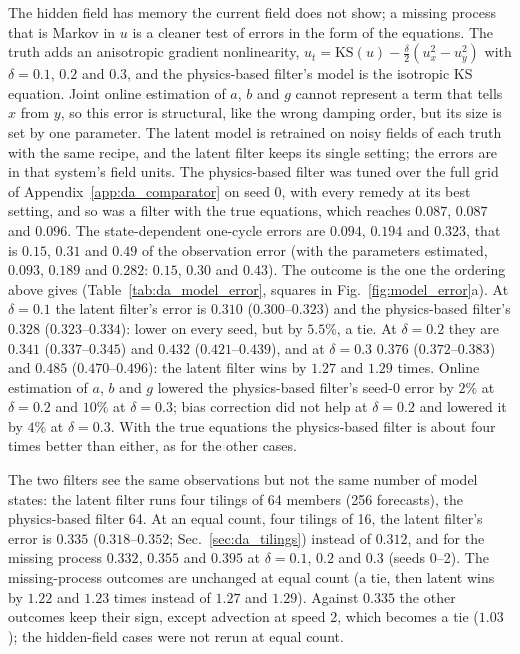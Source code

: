  The hidden field has memory the current field does not show; a missing process
that is Markov in $u$ is a cleaner test of errors in the form of the equations. The truth adds an anisotropic gradient nonlinearity,
$u_t=\mathrm{KS}(u)-\tfrac{\delta}{2}(u_x^2-u_y^2)$ with $\delta=0.1$, $0.2$ and $0.3$, and the
physics-based filter's model is the isotropic KS equation. Joint online estimation of $a$, $b$ and $g$
cannot represent a term that tells $x$ from $y$, so this error is structural, like the wrong damping
order, but its size is set by one parameter. The latent model is retrained on noisy fields of each truth
with the same recipe, and the latent filter keeps its single setting; the errors are in that system's field
units. The physics-based filter was tuned over the full grid of Appendix~\ref{app:da_comparator} on seed
0, with every remedy at its best setting, and so was a filter with the true equations, which reaches
$0.087$, $0.087$ and $0.096$. The state-dependent one-cycle errors are $0.094$, $0.194$ and $0.323$, that is
$0.15$, $0.31$ and $0.49$ of the observation error (with the parameters estimated, $0.093$, $0.189$ and
$0.282$: $0.15$, $0.30$ and $0.43$). The outcome is the one the ordering above gives (Table~\ref{tab:da_model_error}, squares in
Fig.~\ref{fig:model_error}a). At $\delta=0.1$ the latent filter's error is $0.310$ ($0.300$--$0.323$) and
the physics-based filter's $0.328$ ($0.323$--$0.334$): lower on every seed, but by $5.5\%$, a tie. At
$\delta=0.2$ they are $0.341$ ($0.337$--$0.345$) and $0.432$ ($0.421$--$0.439$), and at $\delta=0.3$
$0.376$ ($0.372$--$0.383$) and $0.485$ ($0.470$--$0.496$): the latent filter wins by $1.27$ and $1.29$
times. Online estimation of $a$, $b$ and $g$ lowered the physics-based filter's seed-0 error by $2\%$ at
$\delta=0.2$ and $10\%$ at $\delta=0.3$; bias correction did not help at $\delta=0.2$ and lowered it by $4\%$
at $\delta=0.3$. With the true equations the physics-based filter is about four times better than either,
as for the other cases.

 The two filters see the same observations but not the same number of model
states: the latent filter runs four tilings of 64 members (256 forecasts), the physics-based filter 64. At an equal count, four tilings of 16, the latent
filter's error is $0.335$ ($0.318$--$0.352$; Sec.~\ref{sec:da_tilings}) instead of $0.312$, and for the
missing process $0.332$, $0.355$ and $0.395$ at $\delta=0.1$, $0.2$ and $0.3$ (seeds 0--2). The missing-process
outcomes are unchanged at equal count (a tie, then latent wins by $1.22$ and $1.23$ times instead of $1.27$
and $1.29$). Against $0.335$ the other outcomes keep their sign, except advection at speed 2, which
becomes a tie ($1.03$); the hidden-field cases were not rerun at equal count.

